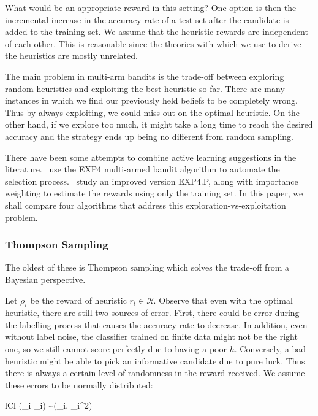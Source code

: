 \documentclass[fleqn,10pt,lineno]{wlpeerj} %
\newcommand{\Normal}{\mathcal{N}}
\newcommand{\R}{\mathcal{R}}
\begin{document}
What would be an appropriate reward in this setting? One option is then the
incremental increase in the accuracy rate of a test set after the candidate is
added to the training set. We assume that the heuristic rewards are independent
of each other. This is reasonable since the theories with which we use to
derive the heuristics are mostly unrelated.

The main problem in multi-arm bandits is the trade-off between exploring random
heuristics and exploiting the best heuristic so far. There are many instances
in which we find our previously held beliefs to be completely wrong. Thus by
always exploiting, we could miss out on the optimal heuristic. On the other
hand, if we explore too much, it might take a long time to reach the desired
accuracy and the strategy ends up being no different from random sampling.

There have been some attempts to combine active learning suggestions in the
literature.~\cite{baram04} use the EXP4 multi-armed bandit algorithm to
automate the selection process.~\cite{hsu15} study an improved version
EXP4.P, along with importance weighting to estimate the rewards using only the
training set. In this paper, we shall compare four algorithms that address this
exploration-vs-exploitation problem.

\subsubsection*{Thompson Sampling}

The oldest of these is Thompson sampling \citep{thompson33} which solves the
trade-off from a Bayesian perspective.

Let $\rho_i$ be the reward of heuristic $r_i \in \R$. Observe
that even with the optimal heuristic, there are still two sources of error.
First, there could be error during the labelling process that causes the
accuracy rate to decrease. In addition, even without label noise, the
classifier trained on finite data might not be the right one, so we still
cannot score perfectly due to having a poor $h$. Conversely, a bad heuristic
might be able to pick an informative candidate due to pure luck. Thus there is
always a certain level of randomness in the reward received. We assume these
errors to be normally distributed:
	\begin{IEEEeqnarray*}{lCl}
		(\rho_i \mid \nu_i) \sim \Normal(\nu_i, \tau_i^2)
	\end{IEEEeqnarray*}
\end{document}
